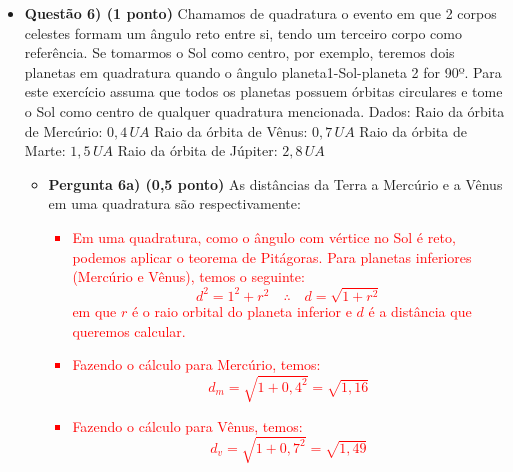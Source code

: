 \documentclass[a4paper, 12pt]{article}
\newcommand{\red}[1]{\textcolor{red}{#1}}
\begin{document}
\begin{flushleft}
\begin{itemize}
            \item \textbf{Questão 6) (1 ponto)} Chamamos de quadratura o evento em que 2 corpos celestes formam um ângulo reto entre si, tendo um terceiro corpo como referência. Se tomarmos o Sol como centro, por exemplo, teremos dois planetas em quadratura quando o ângulo planeta1-Sol-planeta 2 for 90º. Para este exercício assuma que todos os planetas possuem órbitas circulares e tome o Sol como centro de qualquer quadratura mencionada. \linebreak \linebreak Dados: \linebreak Raio da órbita de Mercúrio: $0,4 \, UA$ \linebreak Raio da órbita de Vênus: $0,7 \, UA$ \linebreak Raio da órbita de Marte: $1,5 \, UA$ \linebreak Raio da órbita de Júpiter: $2,8 \, UA$
                \begin{itemize}
                    \item \textbf{Pergunta 6a) (0,5 ponto)} As distâncias da Terra a Mercúrio e a Vênus em uma quadratura são respectivamente:
                        \red{\begin{itemize}
                            \item Em uma quadratura, como o ângulo com vértice no Sol é reto, podemos aplicar o teorema de Pitágoras. Para planetas inferiores (Mercúrio e Vênus), temos o seguinte:
                                \begin{equation*}
                                    d^2=1^2+r^2 \quad \therefore \quad d=\sqrt{1+r^2}
                                \end{equation*}
                                em que $r$ é o raio orbital do planeta inferior e $d$ é a distância que queremos calcular.
                            \item Fazendo o cálculo para Mercúrio, temos:
                                \begin{equation*}
                                    d_m=\sqrt{1+0,4^2}=\sqrt{1,16}
                                \end{equation*}
                            \item Fazendo o cálculo para Vênus, temos:
                                \begin{equation*}
                                    d_v=\sqrt{1+0,7^2}=\sqrt{1,49}
                                \end{equation*}

\end{itemize}}
\end{itemize}
\end{itemize}
\end{flushleft}
\end{document}
